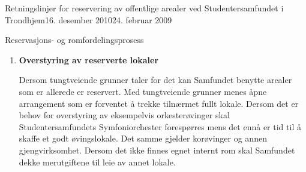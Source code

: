 \begin{instruks}{Retningslinjer for reservering av offentlige arealer
    ved Studentersamfundet i Trondhjem}{16. desember 2010}{24. februar 2009}
\begin{instruksledd}{Reservasjons- og romfordelingsprosess}
\begin{enumerate}
                I etterkant av semesterets rombookingsmøte kan Kontrollkontoret
                fortløpende reservere rom
                til interesserte.
                \begin{enumerate}
                    \item  Ledige lokaler tildeles i henhold til normer for
                        prioritering.
                    \item Utlån/-leie skal vanligvis ikke gå på bekostning av interne
                        romreservasjoner. Punkt 5.3 beskriver
                        retningslinjer ved overstyring av reserverte lokaler.
                    \item Romutlån til eksterne arrangementer som ikke står i
                        semesterprogrammet fastsettes endelig to uker før
                        arrangementet.
                    \item Romutleie som ikke står i semesterprogrammet kan fastsettes
                        to måneder før arrangementet dersom særlige
                        grunner taler for det.
                    \item Endringer og informasjon om ledige arealer skal til enhver
                        tid ligge oppdatert på robokop.samfundet.no.
                \end{enumerate}

            \item \textbf{Overstyring av reserverte lokaler}

                Dersom tungtveiende grunner taler for det kan Samfundet benytte
                arealer som er allerede er reservert. Med
                tungtveiende grunner menes åpne arrangement som er forventet å trekke
                tilnærmet fullt lokale. Dersom det er behov
                for overstyring av eksempelvis orkesterøvinger skal
                Studentersamfundets Symfoniorchester forespørres mens det ennå
                er tid til å skaffe et godt øvingslokale. Det samme gjelder korøvinger
                og annen gjengvirksomhet. Dersom det ikke
                finnes egnet internt rom skal Samfundet dekke merutgiftene til leie av
                annet lokale.
        \end{enumerate}

    \end{instruksledd}


\end{instruks}
